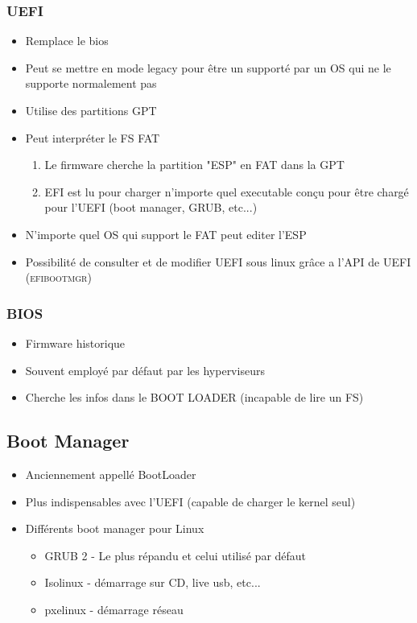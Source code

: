 \documentclass[a4paper]{article}
\begin{document}
      \subsubsection{UEFI}
      \begin{itemize}[label = \textbullet, font = \Large]
        \item Remplace le bios
        \item Peut se mettre en mode legacy pour être un supporté par un OS qui ne le supporte normalement pas
        \item Utilise des partitions GPT
        \item Peut interpréter le FS FAT
        \begin{enumerate}
          \item Le firmware cherche la partition "ESP" en FAT dans la GPT
          \item EFI est lu pour charger n'importe quel executable conçu pour être chargé pour l'UEFI (boot manager, GRUB, etc...)
        \end{enumerate}
        \item N'importe quel OS qui support le FAT peut editer l'ESP 
        \item Possibilité de consulter et de modifier UEFI sous linux grâce a l'API de UEFI (\textsc{efibootmgr})
      \end{itemize}

      \subsubsection{BIOS}
      \begin{itemize}[label = \textbullet, font = \Large]
        \item Firmware historique
        \item Souvent employé par défaut par les hyperviseurs
        \item Cherche les infos dans le BOOT LOADER (incapable de lire un FS)
      \end{itemize}

      \subsection{Boot Manager}
      \begin{itemize}[label = \textbullet, font = \Large]
        \item Anciennement appellé BootLoader
        \item Plus indispensables avec l'UEFI (capable de charger le kernel seul)
        \item Différents boot manager pour Linux
        \begin{itemize}[label=, font=\scriptsize] 
          \item GRUB 2 - Le plus répandu et celui utilisé par défaut
          \item Isolinux - démarrage sur CD, live usb, etc... 
          \item pxelinux - démarrage réseau
        \end{itemize}
      \end{itemize}
\end{document}
